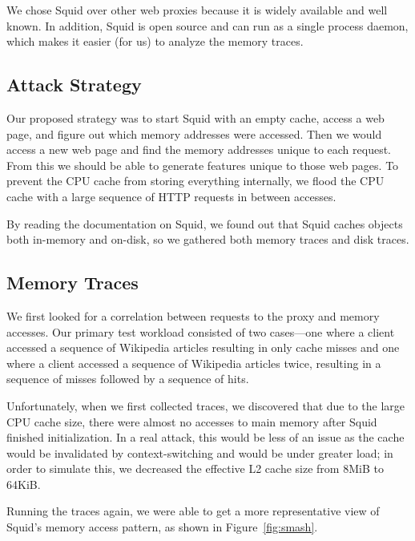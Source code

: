 \documentclass[11pt, oneside]{article}
\newcommand{\fref}[1]{Figure~\ref{#1}}
\begin{document}
We chose Squid over other web proxies because it is widely available and well 
known. In addition, Squid is open source and can run as a single process 
daemon, which makes it easier (for us) to analyze the memory traces.

\subsection{Attack Strategy}
Our proposed strategy was to start Squid with an empty cache, access a web 
page, and figure out which memory addresses were accessed. Then we would
access a new web page and find the memory addresses unique to each request. 
From this we should be able to generate features unique to those web pages.
To prevent the CPU cache from storing everything internally, we flood the
CPU cache with a large sequence of HTTP requests in between accesses.

By reading the documentation on Squid, we found out that Squid caches objects
both in-memory and on-disk, so we gathered both memory traces
and disk traces.

\subsection{Memory Traces}
We first looked for a correlation between requests to the proxy and memory
accesses. Our primary test workload consisted of two cases---one where
a client accessed a sequence of Wikipedia articles resulting in only cache
misses and one where a client accessed a sequence of Wikipedia articles
twice, resulting in a sequence of misses followed by a sequence of hits.

Unfortunately, when we first collected traces, we discovered that due to
the large CPU cache size, there were almost no accesses to main memory
after Squid finished initialization. In a real attack, this would be less
of an issue as the cache would be invalidated by context-switching and
would be under greater load; in order to simulate this, we decreased the
effective L2 cache size from 8MiB to 64KiB.

Running the traces again, we were able to get a more representative view
of Squid's memory access pattern, as shown in \fref{fig:smash}.
\end{document}

